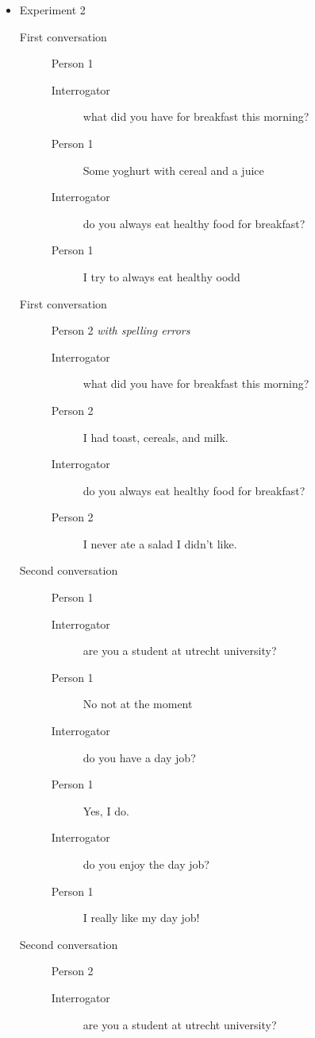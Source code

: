 \begin{itemize}
   \item Experiment 2
      \begin{description}
         \item [First conversation] Person 1
            \begin{description}
               \item [Interrogator] what did you have for breakfast this morning?
               \item [Person 1] Some yoghurt with cereal and a juice
               \item [Interrogator] do you always eat healthy food for breakfast?
               \item [Person 1] I try to always eat healthy oodd
            \end{description}
         \item [First conversation] Person 2 \textit{with spelling errors}
            \begin{description}
               \item [Interrogator] what did you have for breakfast this morning?
               \item [Person 2] I had toast, cereals, and milk.
               \item [Interrogator] do you always eat healthy food for breakfast?
               \item [Person 2] I never ate a salad I didn't like.
            \end{description}
         \item [Second conversation] Person 1
            \begin{description}
               \item [Interrogator] are you a student at utrecht university?
               \item [Person 1] No not at the moment
               \item [Interrogator] do you have a day job?
               \item [Person 1] Yes, I do.
               \item [Interrogator] do you enjoy the day job?
               \item [Person 1] I really like my day job!
            \end{description}
         \item [Second conversation] Person 2
            \begin{description}
               \item [Interrogator] are you a student at utrecht university?

\end{description}
\end{description}
\end{itemize}
